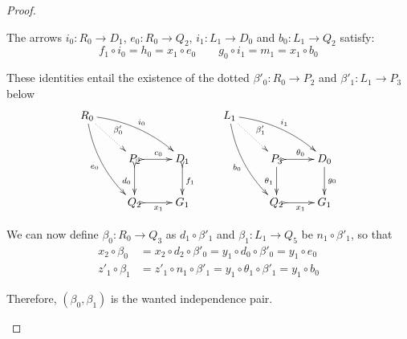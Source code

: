\documentclass[a4paper,UKenglish,cleveref,pdftex,thm-restate,numberwithinsect,anonymous]{lipics}
\begin{document}
\begin{proof}
\begin{enumerate}
		The arrows $i_0\colon R_0\to D_1$,
		$e_0\colon R_0\to Q_2$, $i_1\colon L_1\to D_0$ and $b_0\colon L_1 \to Q_2$ satisfy:
		\[
		f_1\circ i_0  = h_0 =x_1\circ e_0 \qquad 
		g_0\circ i_1 = m_1 = x_1 \circ b_0 \]
		
		These identities entail the existence of the dotted
		$\beta'_0\colon R_0\to P_2$ and $\beta'_1\colon L_1\to P_3$ below
		\[\xymatrix{R_0 \ar@{.>}[dr]^{\beta'_0} \ar@/^.3cm/[drr]^{i_0}
			\ar@/_.3cm/[ddr]_{e_0} &&& L_1 \ar@{.>}[dr]^{\beta'_1} \ar@/^.3cm/[drr]^{i_1}
			\ar@/_.3cm/[ddr]_{b_0}\\ &P_2 \ar@{>->}[r]^{c_0} \ar@{>->}[d]_{d_0}& D_1
			\ar@{>->}[d]^{f_1} & &P_3 \ar@{>->}[r]^{\theta_0} \ar[d]_{\theta_1}& D_0 \ar[d]^{g_0}\\ &Q_2\ar@{>->}[r]_{x_1} & G_1 & &Q_2\ar@{>->}[r]_{x_1} & G_1}\]
		
		We can now define $\beta_0\colon R_0\to Q_3$ as $d_1\circ \beta'_1$ and $\beta_1\colon L_1\to Q_5$ be $n_1\circ \beta'_1$, so that
		\begin{align*}
			x_2\circ \beta_0 & =x_2\circ d_2\circ \beta'_0 = y_1\circ d_0\circ \beta'_0=y_1\circ e_0\\
			z'_1 \circ \beta_1 & = z'_1 \circ n_1\circ \beta'_1 =y_1\circ \theta_1\circ \beta'_1=y_1\circ b_0
		\end{align*}
		
		Therefore, $(\beta_0, \beta_1)$ is the wanted independence pair.
		

\end{enumerate}
\end{proof}
\end{document}
